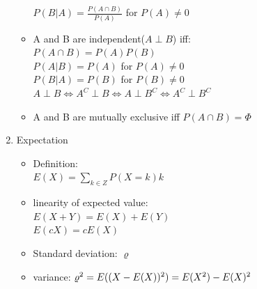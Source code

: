 \documentclass[11pt, a4paper]{article}
\begin{document}
\begin{multicols}{3}
\begin{enumerate}
\begin{itemize}
                    $P(B|A) = \frac {P(A \cap B)}{P(A)}$ for $P(A) \neq 0$
                \item A and B are independent($A \perp B$) iff:\\
                    $P(A \cap B) = P(A)P(B)$\\
                    $P(A|B) = P(A)$ for $P(A) \neq 0$\\
                    $P(B|A) = P(B)$ for $P(B) \neq 0$\\
                    $A \perp B \iff A^C \perp B \iff A \perp B^C \iff A^C \perp B^C$
                \item A and B are mutually exclusive iff $P(A \cap B) = \Phi$
            \end{itemize}
        \item Expectation
            \begin{itemize}
                \item Definition: \\
                    $E(X) = \sum_{k \in Z}{P(X=k)k}$
                \item linearity of expected value:\\
                    $E(X + Y) = E(X) + E(Y)$\\
                    $E(cX) = cE(X)$
                \item Standard deviation: $\varrho$
                \item variance: $\varrho^2\\
                    = E((X - E(X))^2)\\
                    = E(X^2) - E(X)^2$                
            \end{itemize}
    \end{enumerate}


\end{multicols}
\end{document}
